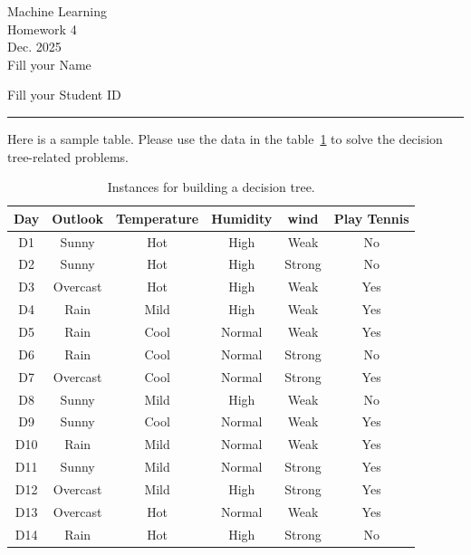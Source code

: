 \documentclass[12pt,letterpaper, onecolumn]{exam}
\begin{document}
\begingroup  
    \centering
    \LARGE Machine Learning\\
    \LARGE Homework 4\\[0.5em]
    \large Dec. 2025\\[0.5em]
    \large Fill your Name\par
    \large Fill your Student ID\par
\endgroup
\rule{\textwidth}{0.4pt}
\pointsdroppedatright   %
\printanswers
\renewcommand{\solutiontitle}{\noindent\textbf{Ans:}\enspace}   %

\begin{questions} 
    \question Here is a sample table. Please use the data in the table~\ref{tab:decision_tree} to solve the decision tree-related problems.
    \begin{table}[!h]
        \centering
        \begin{tabular}{c|ccccc}
        \toprule[2pt]
            \textbf{Day} & \textbf{Outlook} & \textbf{Temperature} & \textbf{Humidity} & \textbf{wind} & \textbf{Play Tennis}\\
            \midrule
            D1& Sunny & Hot & High & Weak & No \\
            D2& Sunny & Hot & High & Strong & No \\
            D3& Overcast & Hot & High & Weak & Yes \\
            D4& Rain & Mild & High & Weak & Yes \\
            D5& Rain & Cool & Normal & Weak & Yes \\
            D6& Rain & Cool & Normal & Strong & No \\
            D7& Overcast & Cool & Normal & Strong & Yes \\
            D8& Sunny & Mild & High & Weak & No \\
            D9& Sunny & Cool & Normal & Weak & Yes \\
            D10& Rain & Mild & Normal & Weak & Yes \\
            D11& Sunny & Mild & Normal & Strong & Yes \\
            D12& Overcast & Mild & High & Strong & Yes \\
            D13& Overcast & Hot & Normal & Weak & Yes \\
            D14& Rain & Hot & High & Strong & No \\
            
        \bottomrule[2pt]
        \end{tabular}
        \caption{Instances for building a decision tree.}
        \label{tab:decision_tree}
    \end{table}
    

\end{questions}
\end{document}
